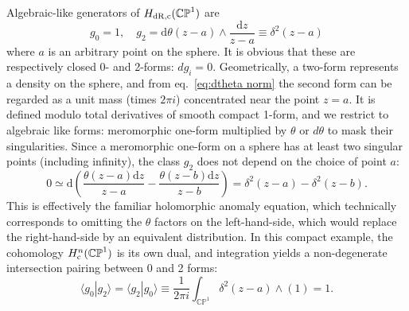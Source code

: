 \documentclass[11pt]{article}
\renewcommand{\d}{\text{d}}
\newcommand{\be}{\begin{equation}}
\newcommand{\ee}{\end{equation}}
\newcommand{\braket}[2]{\big\langle{#1}|{#2}\big\rangle}
\newcommand{\CP}{\mathbb{CP}}
\newcommand{\drc}{{\rm dR,c}}
\renewcommand{\th}{\theta}
\begin{document}
Algebraic-like generators of $H_\drc(\CP^1)$ are
\be
 g_0 = 1, \quad g_2 = \d\theta(z-a)\wedge\frac{\d z}{z-a} \equiv \delta^2(z-a) \label{sphere}
\ee
where $a$ is an arbitrary point on the sphere. It is obvious that these are respectively closed 0- and 2-forms: $d g_i=0$.
Geometrically, a two-form represents a density on the sphere, and from eq.~\eqref{eq:dtheta norm} the second form
can be regarded as a unit mass (times $2\pi i$) concentrated near the point $z=a$.
It is defined modulo total derivatives of smooth compact 1-form, and we restrict to algebraic like forms:
meromorphic one-form multiplied by $\theta$ or $d\theta$ to mask their singularities.
Since a meromorphic one-form on a sphere has at least two singular points (including infinity),
the class $g_2$ does not depend on the choice of point $a$:
\be
0\simeq \d\left( \frac{\th(z-a)\d z}{z-a} - \frac{\th(z-b)\d z}{z-b} \right) = \delta^2(z-a) -\delta^2(z-b). \label{holo anomaly}
\ee
This is effectively the familiar holomorphic anomaly equation, which technically corresponds to omitting
the $\th$ factors on the left-hand-side, which would replace the right-hand-side by an equivalent distribution.
In this compact example, the cohomology $H_{\rm c}^n(\CP^1)$ is its own dual,
and integration yields a non-degenerate intersection pairing between 0 and 2 forms:
\be
\braket{g_0}{g_2} = \braket{g_2}{g_0}\equiv \frac{1}{2\pi i}\int_{\CP^1} \delta^2(z-a)\wedge (1) = 1.
\ee
\end{document}
